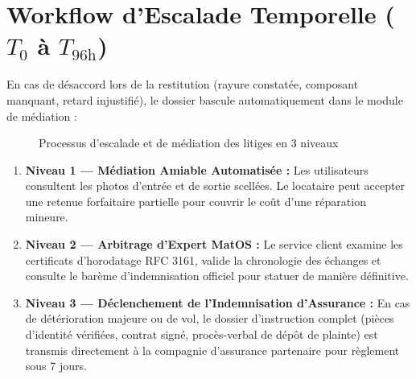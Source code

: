 \documentclass[11pt,a4paper]{report}
\begin{document}
\section{Workflow d'Escalade Temporelle ($T_0$ à $T_{96\text{h}}$)}
En cas de désaccord lors de la restitution (rayure constatée, composant manquant, retard injustifié), le dossier bascule automatiquement dans le module de médiation :

\begin{figure}[h!]
\centering
{}
\caption{Processus d'escalade et de médiation des litiges en 3 niveaux}
\end{figure}

\begin{enumerate}[leftmargin=*]
    \item \textbf{Niveau 1 --- Médiation Amiable Automatisée :} Les utilisateurs consultent les photos d'entrée et de sortie scellées. Le locataire peut accepter une retenue forfaitaire partielle pour couvrir le coût d'une réparation mineure.
    \item \textbf{Niveau 2 --- Arbitrage d'Expert MatOS :} Le service client examine les certificats d'horodatage RFC 3161, valide la chronologie des échanges et consulte le barème d'indemnisation officiel pour statuer de manière définitive.
    \item \textbf{Niveau 3 --- Déclenchement de l'Indemnisation d'Assurance :} En cas de détérioration majeure ou de vol, le dossier d'instruction complet (pièces d'identité vérifiées, contrat signé, procès-verbal de dépôt de plainte) est transmis directement à la compagnie d'assurance partenaire pour règlement sous 7 jours.
\end{enumerate}
\end{document}
